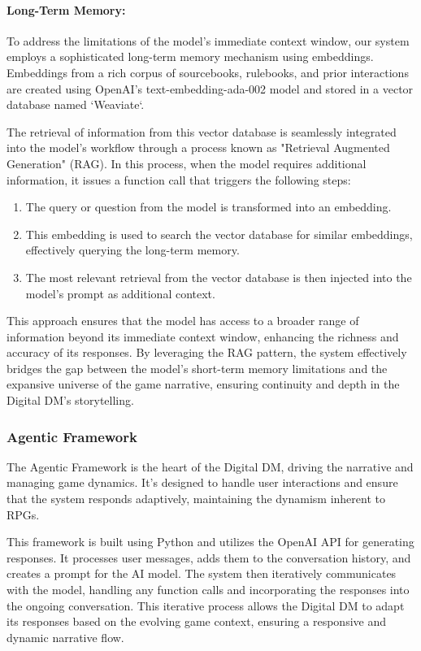 \documentclass[letterpaper]{article}
\begin{document}
\paragraph{Long-Term Memory:}
To address the limitations of the model's immediate context window, our system employs a sophisticated long-term memory mechanism using embeddings. Embeddings from a rich corpus of sourcebooks, rulebooks, and prior interactions are created using OpenAI's text-embedding-ada-002 model and stored in a vector database named `Weaviate`.

The retrieval of information from this vector database is seamlessly integrated into the model's workflow through a process known as "Retrieval Augmented Generation" (RAG). In this process, when the model requires additional information, it issues a function call that triggers the following steps:
\begin{enumerate}
    \item The query or question from the model is transformed into an embedding.
    \item This embedding is used to search the vector database for similar embeddings, effectively querying the long-term memory.
    \item The most relevant retrieval from the vector database is then injected into the model's prompt as additional context.
\end{enumerate}
This approach ensures that the model has access to a broader range of information beyond its immediate context window, enhancing the richness and accuracy of its responses. By leveraging the RAG pattern, the system effectively bridges the gap between the model's short-term memory limitations and the expansive universe of the game narrative, ensuring continuity and depth in the Digital DM's storytelling.


\subsubsection{Agentic Framework}
The Agentic Framework is the heart of the Digital DM, driving the narrative and managing game dynamics. It's designed to handle user interactions and ensure that the system responds adaptively, maintaining the dynamism inherent to RPGs.

This framework is built using Python and utilizes the OpenAI API for generating responses. It processes user messages, adds them to the conversation history, and creates a prompt for the AI model. The system then iteratively communicates with the model, handling any function calls and incorporating the responses into the ongoing conversation. This iterative process allows the Digital DM to adapt its responses based on the evolving game context, ensuring a responsive and dynamic narrative flow.
\end{document}
